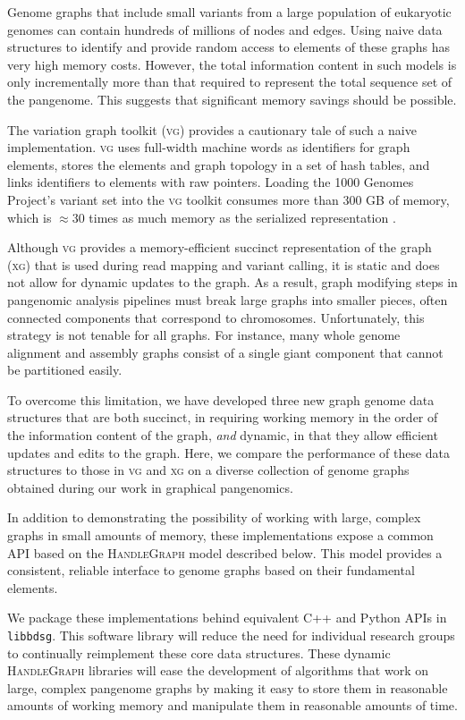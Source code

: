 \documentclass{article}
\begin{document}
Genome graphs that include small variants from a large population of eukaryotic genomes can contain hundreds of millions of nodes and edges.
Using naive data structures to identify and provide random access to elements of these graphs has very high memory costs.
However, the total information content in such models is only incrementally more than that required to represent the total sequence set of the pangenome.
This suggests that significant memory savings should be possible.

The variation graph toolkit (\textsc{vg}) \cite{Garrison_2018} provides a cautionary tale of such a naive implementation.
\textsc{vg} uses full-width machine words as identifiers for graph elements, stores the elements and graph topology in a set of hash tables, and links identifiers to elements with raw pointers.
Loading the 1000 Genomes Project's variant set into the \textsc{vg} toolkit consumes more than 300 GB of memory, which is $\approx$30 times as much memory as the serialized representation \cite{Garrison_2019}.

Although \textsc{vg} provides a memory-efficient succinct representation of the graph (\textsc{xg}) that is used during read mapping and variant calling, it is static and does not allow for dynamic updates to the graph.
As a result, graph modifying steps in pangenomic analysis pipelines must break large graphs into smaller pieces, often connected components that correspond to chromosomes.
Unfortunately, this strategy is not tenable for all graphs.
For instance, many whole genome alignment and assembly graphs consist of a single giant component that cannot be partitioned easily.

To overcome this limitation, we have developed three new graph genome data structures that are both succinct, in requiring working memory in the order of the information content of the graph, \emph{and} dynamic, in that they allow efficient updates and edits to the graph.
Here, we compare the performance of these data structures to those in \textsc{vg} and \textsc{xg} on a diverse collection of genome graphs obtained during our work in graphical pangenomics.

In addition to demonstrating the possibility of working with large, complex graphs in small amounts of memory, these implementations expose a common API based on the \textsc{HandleGraph} model described below.
This model provides a consistent, reliable interface to genome graphs based on their fundamental elements.

We package these implementations behind equivalent C++ and Python APIs in \texttt{libbdsg}.
This software library will reduce the need for individual research groups to continually reimplement these core data structures.
These dynamic \textsc{HandleGraph} libraries will ease the development of algorithms that work on large, complex pangenome graphs by making it easy to store them in reasonable amounts of working memory and manipulate them in reasonable amounts of time.
\end{document}

